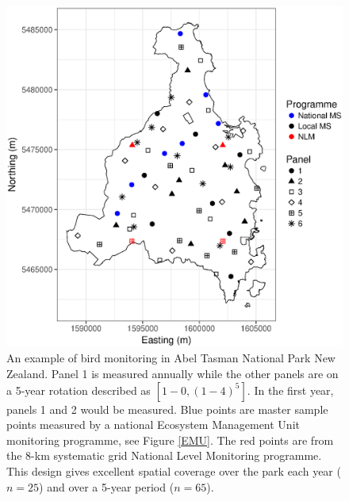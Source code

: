 \documentclass[titlepage]{article}
\begin{document}
\begin{figure}[H]
	\includegraphics[width = \textwidth]{Tasman.eps}
	\caption{An example of bird monitoring in Abel Tasman National Park New Zealand. Panel 1 is measured annually while the other panels are on a 5-year rotation described as $[1-0,(1-4)^5]$. In the first year, panels 1 and 2 would be measured. Blue points are master sample points measured by a national Ecosystem Management Unit monitoring programme, see Figure \ref{EMU}. The red points are from the 8-km systematic grid National Level Monitoring programme. This design gives excellent spatial coverage over the park each year ($n = 25$) and over a 5-year period ($n=65$).}
	\label{Tasman}
\end{figure}
\end{document}
